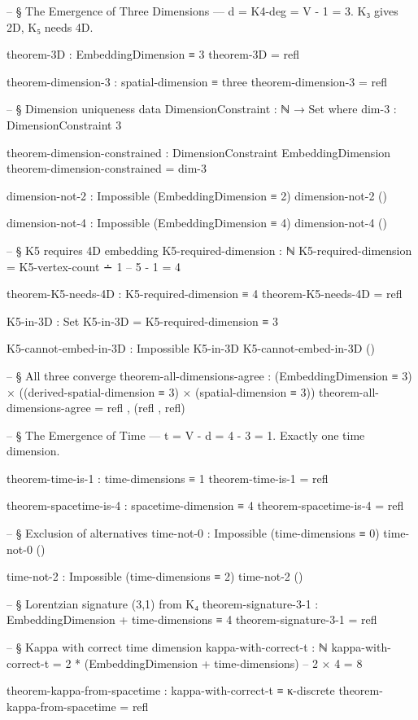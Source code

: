 \documentclass[11pt,a4paper]{book}
\begin{document}
\begin{code}
-- § The Emergence of Three Dimensions — d = K4-deg = V - 1 = 3. K₃ gives 2D, K₅ needs 4D.

theorem-3D : EmbeddingDimension ≡ 3
theorem-3D = refl

theorem-dimension-3 : spatial-dimension ≡ three
theorem-dimension-3 = refl

-- § Dimension uniqueness
data DimensionConstraint : ℕ → Set where
  dim-3 : DimensionConstraint 3

theorem-dimension-constrained : DimensionConstraint EmbeddingDimension
theorem-dimension-constrained = dim-3

dimension-not-2 : Impossible (EmbeddingDimension ≡ 2)
dimension-not-2 ()

dimension-not-4 : Impossible (EmbeddingDimension ≡ 4)
dimension-not-4 ()

-- § K5 requires 4D embedding
K5-required-dimension : ℕ
K5-required-dimension = K5-vertex-count ∸ 1  -- 5 - 1 = 4

theorem-K5-needs-4D : K5-required-dimension ≡ 4
theorem-K5-needs-4D = refl

K5-in-3D : Set
K5-in-3D = K5-required-dimension ≡ 3

K5-cannot-embed-in-3D : Impossible K5-in-3D
K5-cannot-embed-in-3D ()

-- § All three converge
theorem-all-dimensions-agree : (EmbeddingDimension ≡ 3) × ((derived-spatial-dimension ≡ 3) × (spatial-dimension ≡ 3))
theorem-all-dimensions-agree = refl , (refl , refl)

-- § The Emergence of Time — t = V - d = 4 - 3 = 1. Exactly one time dimension.

theorem-time-is-1 : time-dimensions ≡ 1
theorem-time-is-1 = refl

theorem-spacetime-is-4 : spacetime-dimension ≡ 4
theorem-spacetime-is-4 = refl

-- § Exclusion of alternatives
time-not-0 : Impossible (time-dimensions ≡ 0)
time-not-0 ()

time-not-2 : Impossible (time-dimensions ≡ 2)
time-not-2 ()

-- § Lorentzian signature (3,1) from K₄
theorem-signature-3-1 : EmbeddingDimension + time-dimensions ≡ 4
theorem-signature-3-1 = refl

-- § Kappa with correct time dimension
kappa-with-correct-t : ℕ
kappa-with-correct-t = 2 * (EmbeddingDimension + time-dimensions)  -- 2 × 4 = 8

theorem-kappa-from-spacetime : kappa-with-correct-t ≡ κ-discrete
theorem-kappa-from-spacetime = refl


\end{code}
\end{document}
